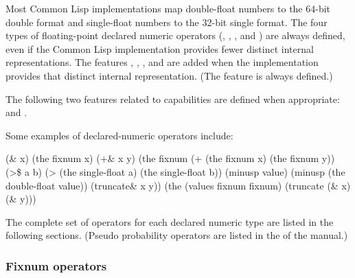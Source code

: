 \documentclass[10pt,twoside,english,pdftex]{article}
\begin{document}
%
%
%
%
%
%
%
%
%
%
Most Common Lisp implementations map double-float numbers to the 64-bit
 double
format and single-float numbers to the 32-bit  single
format.  The four types of floating-point declared numeric operators
(, ,
, and ) are always defined,
even if the Common Lisp implementation provides fewer distinct internal
 representations.  The features ,
, , and
 are added when the implementation provides that
distinct internal  representation.  (The feature
 is always defined.)

%
%
The following two features related to  capabilities are defined
when appropriate:  and
. 

Some examples of declared-numeric operators include:
%
\W\supp
\begin{example}
  (\& x) \expands (the fixnum x)
  (+\& x y) \expands (the fixnum (+ (the fixnum x) (the fixnum y))
  (>\$ a b) \expands (> (the single-float a) (the single-float b))
  (minusp$$ value) \expands (minusp (the double-float value))
  (truncate\& x y)) \expands (the (values fixnum fixnum) (truncate (\& x) (\& y)))
\end{example}
%
The complete set of operators for each declared numeric type are listed in the
following sections. (Pseudo probability operators are listed in the
 of the manual.)

\T\clearpage
\W{}
\subsubsection{Fixnum  operators}
\end{document}
